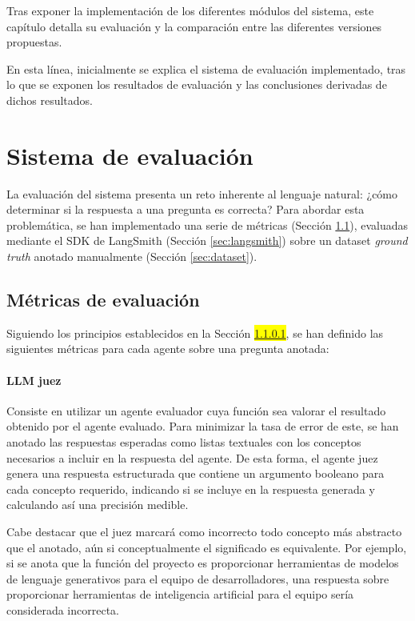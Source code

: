 Tras exponer la implementación de los diferentes módulos del sistema, este capítulo detalla su evaluación y la comparación entre las diferentes versiones propuestas.

En esta línea, inicialmente se explica el sistema de evaluación implementado, tras lo que se exponen los resultados de evaluación y las conclusiones derivadas de dichos resultados. 

\section{Sistema de evaluación}
La evaluación del sistema presenta un reto inherente al lenguaje natural: ¿cómo determinar si la respuesta a una pregunta es correcta? Para abordar esta problemática, se han implementado una serie de métricas (Sección \ref{sec:metricas}), evaluadas mediante el SDK de LangSmith (Sección \ref{sec:langsmith}) sobre un dataset \textit{ground truth} anotado manualmente (Sección \ref{sec:dataset}).

\subsection{Métricas de evaluación}

\label{sec:metricas}
Siguiendo los principios establecidos en la Sección \colorbox{yellow}{\ref{}}, se han definido las siguientes métricas para cada agente sobre una pregunta anotada: 
\paragraph{LLM juez} Consiste en utilizar un agente evaluador cuya función sea valorar el resultado obtenido por el agente evaluado. Para minimizar la tasa de error de este, se han anotado las respuestas esperadas como listas textuales con los conceptos necesarios a incluir en la respuesta del agente. De esta forma, el agente juez genera una respuesta estructurada que contiene un argumento booleano para cada concepto requerido, indicando si se incluye en la respuesta generada y calculando así una precisión medible.

Cabe destacar que el juez marcará como incorrecto todo concepto más abstracto que el anotado, aún si conceptualmente el significado es equivalente. Por ejemplo, si se anota que la función del proyecto es proporcionar herramientas de modelos de lenguaje generativos para el equipo de desarrolladores, una respuesta sobre proporcionar herramientas de inteligencia artificial para el equipo sería considerada incorrecta.


